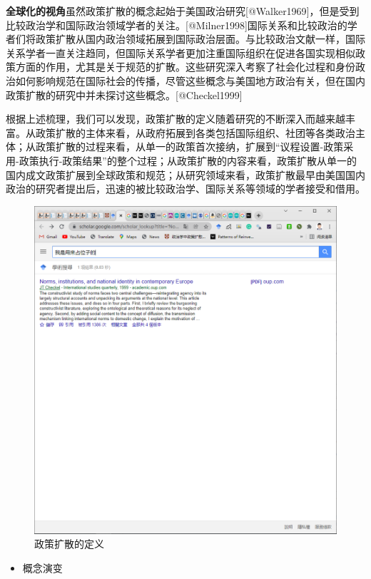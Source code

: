 \documentclass[
  12pt,
]{ctexart}
\providecommand{\tightlist}{%
  \setlength{\itemsep}{0pt}\setlength{\parskip}{0pt}}
\begin{document}
\textbf{全球化的视角}虽然政策扩散的概念起始于美国政治研究{[}@Walker1969{]}，但是受到比较政治学和国际政治领域学者的关注。{[}@Milner1998{]}国际关系和比较政治的学者们将政策扩散从国内政治领域拓展到国际政治层面。与比较政治文献一样，国际关系学者一直关注趋同，但国际关系学者更加注重国际组织在促进各国实现相似政策方面的作用，尤其是关于规范的扩散。这些研究深入考察了社会化过程和身份政治如何影响规范在国际社会的传播，尽管这些概念与美国地方政治有关，但在国内政策扩散的研究中并未探讨这些概念。{[}@Checkel1999{]}

根据上述梳理，我们可以发现，政策扩散的定义随着研究的不断深入而越来越丰富。从政策扩散的主体来看，从政府拓展到各类包括国际组织、社团等各类政治主体；从政策扩散的过程来看，从单一的政策首次接纳，扩展到``议程设置-政策采用-政策执行-政策结果''的整个过程；从政策扩散的内容来看，政策扩散从单一的国内成文政策扩展到全球政策和规范；从研究领域来看，政策扩散最早由美国国内政治的研究者提出后，迅速的被比较政治学、国际关系等领域的学者接受和借用。

\begin{figure}
\includegraphics[width=1\linewidth]{../figures/ngram} \caption{政策扩散的定义}\label{fig:unnamed-chunk-2}
\end{figure}

\begin{itemize}
\tightlist
\item
  概念演变
\end{itemize}
\end{document}
